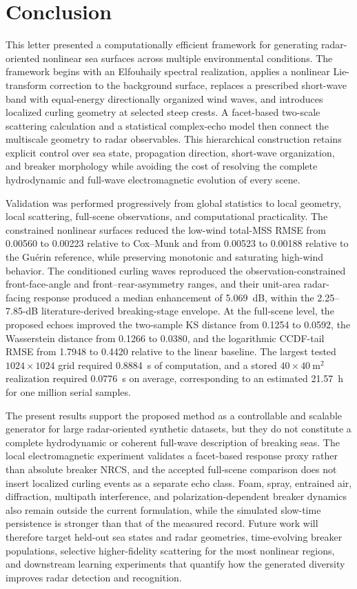 \section{Conclusion}
\label{sec:conclusion}

This letter presented a computationally efficient framework for generating radar-oriented nonlinear sea surfaces across multiple environmental conditions. The framework begins with an Elfouhaily spectral realization, applies a nonlinear Lie-transform correction to the background surface, replaces a prescribed short-wave band with equal-energy directionally organized wind waves, and introduces localized curling geometry at selected steep crests. A facet-based two-scale scattering calculation and a statistical complex-echo model then connect the multiscale geometry to radar observables. This hierarchical construction retains explicit control over sea state, propagation direction, short-wave organization, and breaker morphology while avoiding the cost of resolving the complete hydrodynamic and full-wave electromagnetic evolution of every scene.

Validation was performed progressively from global statistics to local geometry, local scattering, full-scene observations, and computational practicality. The constrained nonlinear surfaces reduced the low-wind total-MSS RMSE from 0.00560 to 0.00223 relative to Cox--Munk and from 0.00523 to 0.00188 relative to the Gu\'erin reference, while preserving monotonic and saturating high-wind behavior. The conditioned curling waves reproduced the observation-constrained front-face-angle and front--rear-asymmetry ranges, and their unit-area radar-facing response produced a median enhancement of 5.069~dB, within the 2.25--7.85-dB literature-derived breaking-stage envelope. At the full-scene level, the proposed echoes improved the two-sample KS distance from 0.1254 to 0.0592, the Wasserstein distance from 0.1266 to 0.0380, and the logarithmic CCDF-tail RMSE from 1.7948 to 0.4420 relative to the linear baseline. The largest tested $1024\times1024$ grid required 0.8884~s of computation, and a stored $40\times40~\mathrm{m}^2$ realization required 0.0776~s on average, corresponding to an estimated 21.57~h for one million serial samples.

The present results support the proposed method as a controllable and scalable generator for large radar-oriented synthetic datasets, but they do not constitute a complete hydrodynamic or coherent full-wave description of breaking seas. The local electromagnetic experiment validates a facet-based response proxy rather than absolute breaker NRCS, and the accepted full-scene comparison does not insert localized curling events as a separate echo class. Foam, spray, entrained air, diffraction, multipath interference, and polarization-dependent breaker dynamics also remain outside the current formulation, while the simulated slow-time persistence is stronger than that of the measured record. Future work will therefore target held-out sea states and radar geometries, time-evolving breaker populations, selective higher-fidelity scattering for the most nonlinear regions, and downstream learning experiments that quantify how the generated diversity improves radar detection and recognition.
